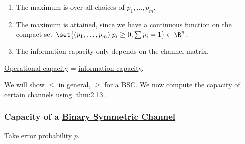 \documentclass{article}
\newcommand{\1}[1]{\mathbbm{1}_{#1}}
\begin{document}
\begin{remark}\leavevmode
    \begin{enumerate}[label=(\roman*)]
        \item The maximum is over all choices of $p_1, \dotsc, p_m$.
        \item The maximum is attained, since we have a continuous function on the compact set $\set{(p_1, \dotsc, p_m) | p_i \geq 0, \sum p_i = 1} \subset \R^n$.
        \item The information capacity only depends on the channel matrix.
    \end{enumerate}
\end{remark}

\begin{nthm}\label{thm:2.13}
    \hyperlink{def:capacity}{Operational capacity} = \hyperlink{def:infoChannelCapacity}{information capacity}.
\end{nthm}
We will show $\leq$ in general, $\geq$ for a \hyperlink{def:bsc}{BSC}.
We now compute the capacity of certain channels using \cref{thm:2.13}.

\subsubsection*{Capacity of a \hyperlink{def:bsc}{Binary Symmetric Channel}}
Take error probability $p$.
\end{document}
